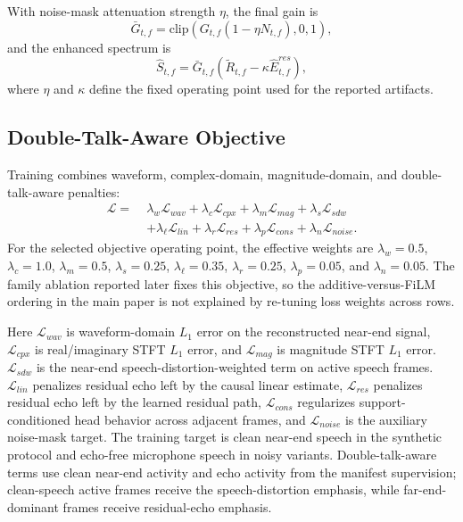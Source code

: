 \documentclass[journal]{IEEEtran}
\begin{document}
With noise-mask attenuation strength $\eta$, the final gain is
\begin{equation}
\bar{G}_{t,f}=\mathrm{clip}\!\left(G_{t,f}(1-\eta N_{t,f}),0,1\right),
\end{equation}
and the enhanced spectrum is
\begin{equation}
\hat{S}_{t,f}=\bar{G}_{t,f}\left(\tilde{R}_{t,f}-\kappa\hat{E}^{res}_{t,f}\right),
\end{equation}
where $\eta$ and $\kappa$ define the fixed operating point used for the reported artifacts.

\subsection{Double-Talk-Aware Objective}
Training combines waveform, complex-domain, magnitude-domain, and double-talk-aware penalties:
\begin{equation}
\begin{aligned}
\mathcal{L} =\;&
\lambda_w \mathcal{L}_{wav}
+ \lambda_c \mathcal{L}_{cpx}
+ \lambda_m \mathcal{L}_{mag}
+ \lambda_s \mathcal{L}_{sdw}\\
&+ \lambda_\ell \mathcal{L}_{lin}
+ \lambda_r \mathcal{L}_{res}
+ \lambda_p \mathcal{L}_{cons}
+ \lambda_n \mathcal{L}_{noise}.
\end{aligned}
\end{equation}
For the selected objective operating point, the effective weights are
$\lambda_w=0.5$, $\lambda_c=1.0$, $\lambda_m=0.5$, $\lambda_s=0.25$,
$\lambda_\ell=0.35$, $\lambda_r=0.25$, $\lambda_p=0.05$, and $\lambda_n=0.05$.
The family ablation reported later fixes this objective, so the additive-versus-FiLM ordering in the main paper is not explained by re-tuning loss weights across rows.

Here $\mathcal{L}_{wav}$ is waveform-domain $L_1$ error on the reconstructed near-end signal, $\mathcal{L}_{cpx}$ is real/imaginary STFT $L_1$ error, and $\mathcal{L}_{mag}$ is magnitude STFT $L_1$ error. $\mathcal{L}_{sdw}$ is the near-end speech-distortion-weighted term on active speech frames. $\mathcal{L}_{lin}$ penalizes residual echo left by the causal linear estimate, $\mathcal{L}_{res}$ penalizes residual echo left by the learned residual path, $\mathcal{L}_{cons}$ regularizes support-conditioned head behavior across adjacent frames, and $\mathcal{L}_{noise}$ is the auxiliary noise-mask target. The training target is clean near-end speech in the synthetic protocol and echo-free microphone speech in noisy variants. Double-talk-aware terms use clean near-end activity and echo activity from the manifest supervision; clean-speech active frames receive the speech-distortion emphasis, while far-end-dominant frames receive residual-echo emphasis.
\end{document}
